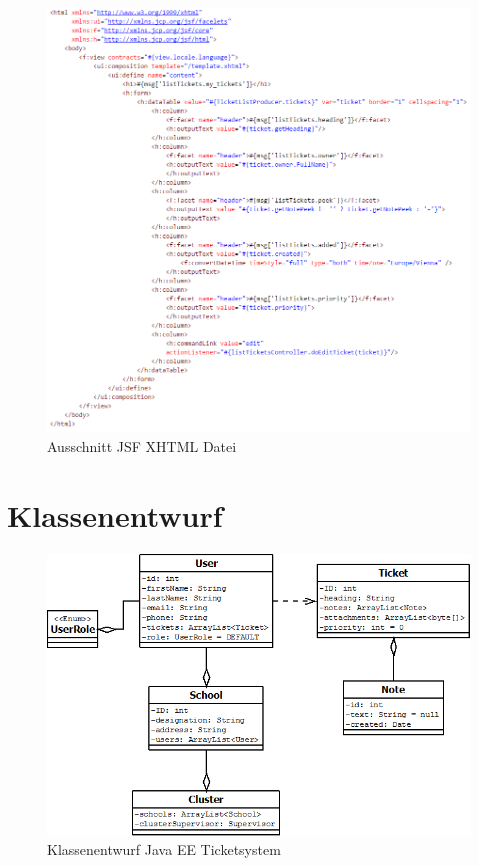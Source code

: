 \begin{figure}[h]
	\centering
	\includegraphics[scale=0.75]{figures/serverFacesCode.png}
	\caption{Ausschnitt JSF XHTML Datei}
	\label{Abb_Jsf_XHTML_Code}
\end{figure}

\newpage
\section{Klassenentwurf}

\begin{figure}[h]
	\centering
	\includegraphics[scale=0.6]{figures/klassenentwurf_java_ticketsys_export.png}
	\caption{Klassenentwurf Java EE Ticketsystem}
	\label{Abb_Klassendesign_TicketSys}
\end{figure}

